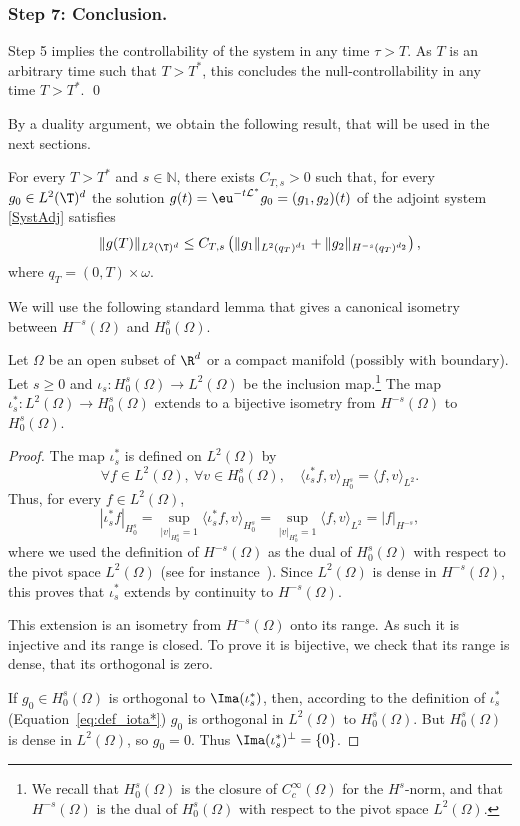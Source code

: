 \subsubsection*{Step 7: Conclusion.} Step 5 implies the controllability of the system in any time \hbox{$\tau>T$}. As $T$ is an arbitrary time such that $T>T^\ast$, this concludes the null-controllability in any time $T>T^\ast$. \hfill\qed
\medskip

By a duality argument, we obtain the following result, that will be used in the next sections.

\begin{corollary}
\label{CorHUM}
For every $T>T^*$ and $s\in\mathbb{N}$, there exists $C_{T,s}>0$ such that,
for every $g_0 \in L^2(\T)^d$ the solution $g(t)=\eu^{-t\mathcal{L}^*} g_0=(g_1,g_2)(t)$ of the adjoint system \eqref{SystAdj} satisfies
\[
\|g(T)\|_{L^2(\T)^d} \leq C_{T,s} \left(\|g_1\|_{L^2(q_T)^{d_1}} + \|g_2\|_{H^{-s}(q_T)^{d_2}} \right),
\]
where $q_T=(0,T)\times\omega$.
\end{corollary}
We will use the following standard lemma that gives a canonical isometry between $H^{-s}(\Omega)$ and $H_0^s(\Omega)$.
\begin{lemma}\label{th:lemma_dual_Hs}
Let $\Omega$ be an open subset of $\R^d$ or a compact manifold (possibly with boundary). Let $s\geq 0$ and $\iota_s\colon H^s_0(\Omega)\to L^2(\Omega)$ be the inclusion map.\footnote{We recall that $H^s_0(\Omega)$ is the closure of $C_c^\infty(\Omega)$ for the $H^s$-norm, and that $H^{-s}(\Omega)$ is the dual of $H^s_0(\Omega)$ with respect to the pivot space $L^2(\Omega)$.} The map $\iota_s^*\colon L^2(\Omega) \to H^s_0(\Omega)$ extends to a bijective isometry from $H^{-s}(\Omega)$ to $H^{s}_0(\Omega)$.
\end{lemma}
\begin{proof}
The map $\iota_s^*$ is defined on $L^2(\Omega)$ by
\begin{equation}\label{eq:def_iota*}
\forall f\in L^2(\Omega),\ \forall v\in H^s_0(\Omega),\quad \langle \iota_s^*f,v\rangle_{H^s_0} = \langle f,v\rangle_{L^2}.\end{equation}
Thus, for every $f\in L^2(\Omega)$,
\[
|\iota_s^*f|_{H^s_0} = \sup_{|v|_{H^s_0} = 1} \langle \iota_s^*f,v\rangle_{H^s_0} = \sup_{|v|_{H^s_0}=1} \langle f,v\rangle_{L^2} = |f|_{H^{-s}},
\]
where we used the definition of $H^{-s}(\Omega)$ as the dual of $H^s_0(\Omega)$ with respect to
the pivot space $L^2(\Omega)$ (see for instance~\cite[\S2.9]{tucsnak_2009}). Since
$L^2(\Omega)$ is dense in $H^{-s}(\Omega)$, this proves that $\iota_s^*$ extends by continuity
to $H^{-s}(\Omega)$.

This extension is an isometry from $H^{-s}(\Omega)$ onto its range. As such it is injective and its range is closed. To prove it is bijective, we check that its range is dense, \ie that its orthogonal is zero.

If $g_0\in H^s_0(\Omega)$ is orthogonal to $\Ima(\iota_s^*)$, then, according to the definition
of $\iota_s^*$ (Equation~\eqref{eq:def_iota*}) $g_0$ is orthogonal in $L^2(\Omega)$ to
$H^s_0(\Omega)$. But $H^s_0(\Omega)$ is dense in $L^2(\Omega)$, so $g_0 = 0$. Thus
$\Ima(\iota_s^*)^\perp = \{0\}$.
\end{proof}


